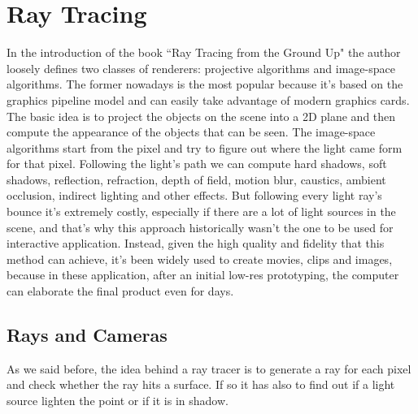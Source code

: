 
\section{Ray Tracing}

In the introduction of the book ``Ray Tracing from the Ground Up"\cite{rt_groundup} the author loosely defines two classes of renderers: projective algorithms and image-space algorithms.
The former nowadays is the most popular because it's based on the graphics pipeline model and can easily take advantage of modern graphics cards.
The basic idea is to project the objects on the scene into a 2D plane and then compute the appearance of the objects that can be seen.
The image-space algorithms start from the pixel and try %
to figure out where the light came form for that pixel.
Following the light's path we can compute hard shadows, soft shadows, reflection, refraction,
 depth of field, motion blur, caustics, ambient occlusion, indirect lighting and other effects.
But following every light ray's bounce it's extremely costly, especially if there are a lot of light sources in the scene, and that's why this approach historically wasn't the one to be used for interactive application.
Instead, given the high quality and fidelity that this method can achieve, it's been widely used to create movies, clips and images,
because in these application, after an initial low-res prototyping, the computer can elaborate the final product even for days.




\subsection{Rays and Cameras}
As we said before, the idea behind a ray tracer is to generate a ray for each pixel and check whether the ray hits a surface.
If so it has also to find out if a light source lighten the point or if it is in shadow.

